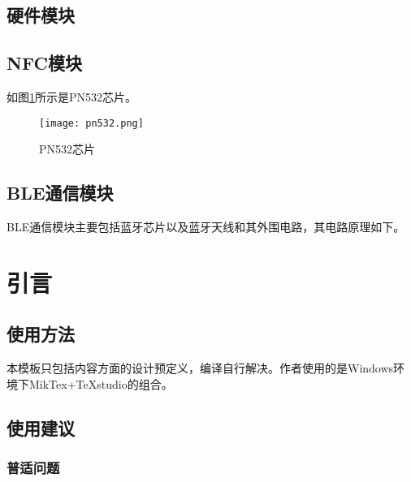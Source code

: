 \section{硬件模块}

\section{NFC模块}
如图\ref{pn532}所示是PN532芯片。

\begin{figure}[!h]
 \centering
 \texttt{[image: pn532.png]}
 \caption{PN532芯片}
 \label{pn532}
\end{figure}




\section{BLE通信模块}

BLE通信模块主要包括蓝牙芯片以及蓝牙天线和其外围电路，其电路原理如下。

\chapter{引言}


\section{使用方法}
\label{sec:usage}

本模板只包括内容方面的设计预定义，编译自行解决。作者使用的是Windows环境下MikTex+TeXstudio的组合。

\section{使用建议}
\label{sec:tips}

\subsection{普适问题}
\label{subsec:common}

